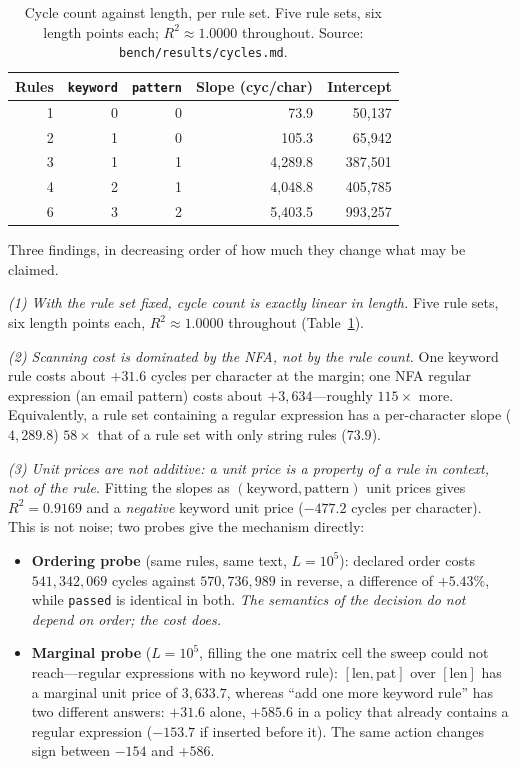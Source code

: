 \documentclass[10pt,journal,compsoc]{IEEEtran}
\newcommand{\tabfont}{\footnotesize}
\begin{document}
\begin{table}[t]
\centering
\caption{Cycle count against length, per rule set. Five rule sets, six length
points each; $R^2 \approx 1.0000$ throughout. Source:
\texttt{bench/results/cycles.md}.}
\label{tab:cycles}
\tabfont
\begin{tabular}{@{}rrrrr@{}}
\toprule
Rules & \texttt{keyword} & \texttt{pattern} & Slope (cyc/char) & Intercept \\
\midrule
1 & 0 & 0 & 73.9      & 50{,}137 \\
2 & 1 & 0 & 105.3     & 65{,}942 \\
3 & 1 & 1 & 4{,}289.8 & 387{,}501 \\
4 & 2 & 1 & 4{,}048.8 & 405{,}785 \\
6 & 3 & 2 & 5{,}403.5 & 993{,}257 \\
\bottomrule
\end{tabular}
\end{table}

Three findings, in decreasing order of how much they change what may be claimed.

\emph{(1) With the rule set fixed, cycle count is exactly linear in length.}
Five rule sets, six length points each, $R^2 \approx 1.0000$ throughout
(Table~\ref{tab:cycles}).

\emph{(2) Scanning cost is dominated by the NFA, not by the rule count.} One
keyword rule costs about $+31.6$ cycles per character at the margin; one NFA
regular expression (an email pattern) costs about $+3{,}634$---roughly
$115\times$ more. Equivalently, a rule set containing a regular expression has a
per-character slope ($4{,}289.8$) $58\times$ that of a rule set with only string
rules ($73.9$).

\emph{(3) Unit prices are not additive: a unit price is a property of a rule
\emph{in context}, not of the rule.} Fitting the slopes as
$(\text{keyword},\text{pattern})$ unit prices gives $R^2 = 0.9169$ and a
\emph{negative} keyword unit price ($-477.2$ cycles per character). This is not
noise; two probes give the mechanism directly:

\begin{itemize}
  \item \textbf{Ordering probe} (same rules, same text, $L = 10^5$): declared
  order costs $541{,}342{,}069$ cycles against $570{,}736{,}989$ in reverse,
  a difference of $+5.43\%$, while \texttt{passed} is identical in both. \emph{The
  semantics of the decision do not depend on order; the cost does.}
  \item \textbf{Marginal probe} ($L = 10^5$, filling the one matrix cell the
  sweep could not reach---regular expressions with no keyword rule):
  $[\text{len},\text{pat}]$ over $[\text{len}]$ has a marginal unit price of
  $3{,}633.7$, whereas ``add one more keyword rule'' has two different answers:
  $+31.6$ alone, $+585.6$ in a policy that already contains a regular expression
  ($-153.7$ if inserted before it). The same action changes sign between
  $-154$ and $+586$.
\end{itemize}
\end{document}
